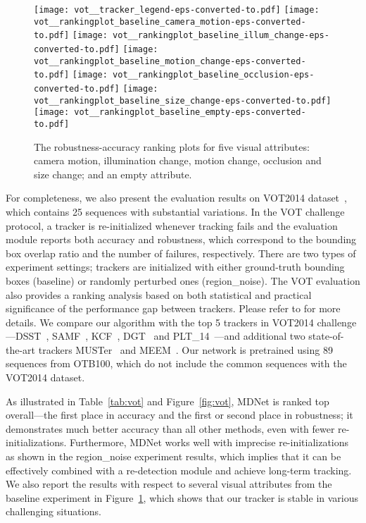 \documentclass[10pt,twocolumn,letterpaper]{article}
\begin{document}
\begin{figure}[t]
\vspace{-2mm}
\begin{center}
\texttt{[image: vot\_\_tracker\_legend-eps-converted-to.pdf]}
\texttt{[image: vot\_\_rankingplot\_baseline\_camera\_motion-eps-converted-to.pdf]}
\texttt{[image: vot\_\_rankingplot\_baseline\_illum\_change-eps-converted-to.pdf]}
\texttt{[image: vot\_\_rankingplot\_baseline\_motion\_change-eps-converted-to.pdf]}
\texttt{[image: vot\_\_rankingplot\_baseline\_occlusion-eps-converted-to.pdf]}
\texttt{[image: vot\_\_rankingplot\_baseline\_size\_change-eps-converted-to.pdf]}
\texttt{[image: vot\_\_rankingplot\_baseline\_empty-eps-converted-to.pdf]}
\end{center}
\vspace{-5mm}
\caption{The robustness-accuracy ranking plots for five visual attributes: camera motion, illumination change, motion change, occlusion and  size change; and an empty attribute.}
\label{fig:vot_attributes}
\end{figure}

For completeness, we also present the evaluation results on VOT2014 dataset~\cite{vot14}, which contains 25 sequences with substantial variations. 
In the VOT challenge protocol, a tracker is re-initialized whenever tracking fails and the evaluation module reports both accuracy and robustness, which correspond to the bounding box overlap ratio and the number of failures, respectively.
There are two types of experiment settings; trackers are initialized with either ground-truth bounding boxes (baseline) or randomly perturbed ones (region\_noise).
The VOT evaluation also provides a ranking analysis based on both statistical and practical significance of the performance gap between trackers. 
Please refer to \cite{vot14} for more details.
We compare our algorithm with the top 5 trackers in VOT2014 challenge---DSST~\cite{danelljan2014accurate}, SAMF~\cite{li2014scale}, KCF~\cite{henriques2015high}, DGT~\cite{cai2013structured} and PLT\_14~\cite{vot14}---and additional two state-of-the-art trackers MUSTer~\cite{hong2015multi} and MEEM~\cite{zhang2014meem}.
Our network is pretrained using 89 sequences from OTB100, which do not include the common sequences with the VOT2014 dataset.
 
As illustrated in Table~\ref{tab:vot} and Figure~\ref{fig:vot}, MDNet is ranked top overall---the first place in accuracy and the first or second place in robustness; it demonstrates much better accuracy than all other methods, even with fewer re-initializations.
Furthermore, MDNet works well with imprecise re-initializations as shown in the region\_noise experiment results, which implies that it can be effectively combined with a re-detection module and achieve long-term tracking.
We also report the results with respect to several visual attributes from the baseline experiment in Figure~\ref{fig:vot_attributes}, which shows that our tracker is stable in various challenging situations.
\end{document}
